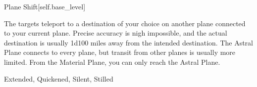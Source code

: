 \begin{spellsection}{Plane Shift}[self.base_level]
\begin{spellcontent}
\begin{spelltargetinginfo}
\end{spelltargetinginfo}
\begin{spelleffects}
\spelleffect
The targets teleport to a destination of your choice on another plane connected to your current plane.
Precise accuracy is nigh impossible, and the actual destination is usually 1d100 miles away from the intended destination.
The Astral Plane connects to every plane, but transit from other planes is usually more limited. From the Material Plane, you can only reach the Astral Plane.
\end{spelleffects}
\end{spellcontent}
\begin{spellfooter}
 Extended, Quickened, Silent, Stilled
\end{spellfooter}
\begin{spellsubcontent}
\end{spellsubcontent}
\end{spellsection}
